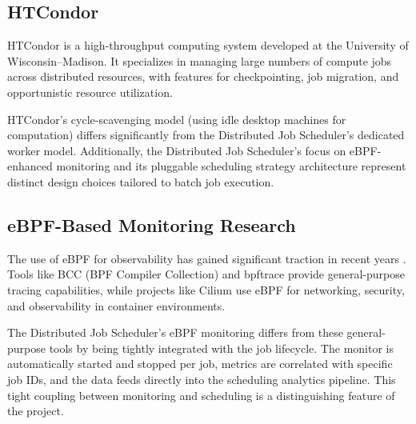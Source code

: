 \subsection{HTCondor}

HTCondor \cite{erickson2018htcondor} is a high-throughput computing system developed at the University of Wisconsin--Madison. It specializes in managing large numbers of compute jobs across distributed resources, with features for checkpointing, job migration, and opportunistic resource utilization.

HTCondor's cycle-scavenging model (using idle desktop machines for computation) differs significantly from the Distributed Job Scheduler's dedicated worker model. Additionally, the Distributed Job Scheduler's focus on eBPF-enhanced monitoring and its pluggable scheduling strategy architecture represent distinct design choices tailored to batch job execution.

\subsection{eBPF-Based Monitoring Research}

The use of eBPF for observability has gained significant traction in recent years \cite{vieira2020ebpf}. Tools like BCC (BPF Compiler Collection) and bpftrace provide general-purpose tracing capabilities, while projects like Cilium use eBPF for networking, security, and observability in container environments.

The Distributed Job Scheduler's eBPF monitoring differs from these general-purpose tools by being tightly integrated with the job lifecycle. The monitor is automatically started and stopped per job, metrics are correlated with specific job IDs, and the data feeds directly into the scheduling analytics pipeline. This tight coupling between monitoring and scheduling is a distinguishing feature of the project.
